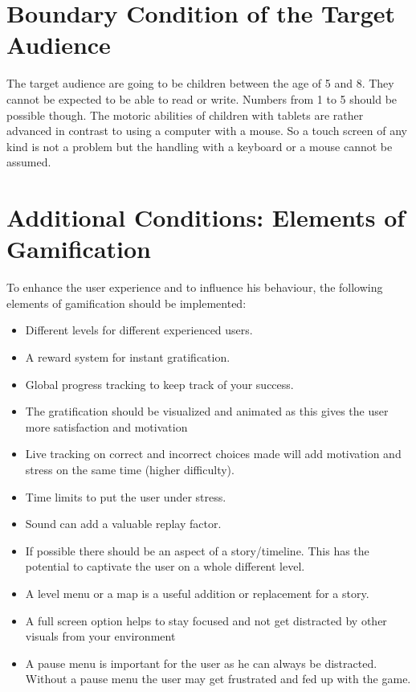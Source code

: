 \section{Boundary Condition of the Target Audience}\label{sec:boundary-condition-of-the-target-audience}
The target audience are going to be children between the age of 5 and 8.
They cannot be expected to be able to read or write. Numbers from 1 to 5 should be possible though.
The motoric abilities of children with tablets are rather advanced in contrast to using a computer with a mouse.
So a touch screen of any kind is not a problem but the handling with a keyboard or a mouse cannot be assumed.

\section{Additional Conditions: Elements of Gamification}\label{sec:additional-conditions:-elements-of-gamification}
To enhance the user experience and to influence his behaviour, the following elements of gamification should be implemented:
\begin{itemize}
    \item Different levels for different experienced users.
    \item A reward system for instant gratification.
    \item Global progress tracking to keep track of your success.
    \item The gratification should be visualized and animated as this gives the user more satisfaction and motivation
    \item Live tracking on correct and incorrect choices made will add motivation and stress on the same time (higher difficulty).
    \item Time limits to put the user under stress.
    \item Sound can add a valuable replay factor.
    \item If possible there should be an aspect of a story/timeline. This has the potential to captivate the user on a
    whole different level.
    \item A level menu or a map is a useful addition or replacement for a story.
    \item A full screen option helps to stay focused and not get distracted by other visuals from your environment
    \item A pause menu is important for the user as he can always be distracted.
    Without a pause menu the user may get frustrated and fed up with the game.
\end{itemize}
